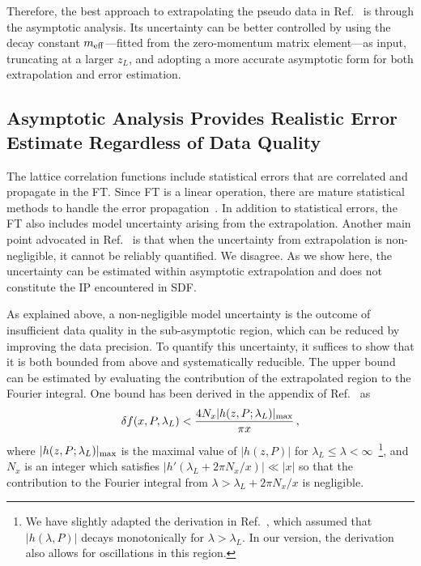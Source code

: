 \documentclass[prd,twocolumn,superscriptaddress,preprintnumbers,showpacs,nofootinbib,notitlepage,floatfix]{revtex4-2}
\begin{document}
Therefore, the best approach to extrapolating the pseudo data in Ref.~\cite{Dutrieux:2025jed} is through the asymptotic analysis. Its uncertainty can be better controlled by using the decay constant $m_{\rm eff}$---fitted from the zero-momentum matrix element---as input, truncating at a larger $z_L$, and adopting a more accurate asymptotic form for both extrapolation and error estimation.

\subsection{Asymptotic Analysis Provides Realistic Error Estimate Regardless of Data Quality}
\label{sec:ft-error}

The lattice correlation functions include statistical errors that are correlated and propagate in the FT. Since FT is a linear operation, there are mature statistical methods to handle the error propagation~\cite{Young:2012kg}. In addition to statistical errors, the FT also includes model uncertainty arising from the extrapolation. Another main point advocated in Ref.~\cite{Dutrieux:2025jed} is that when the uncertainty from extrapolation is non-negligible, it cannot be reliably quantified. We disagree. As we show here, the uncertainty can be estimated within asymptotic extrapolation and does not constitute the IP encountered in SDF.

As explained above, a non-negligible model uncertainty is the outcome of insufficient data quality in the sub-asymptotic region, which can be reduced by improving the data precision. To quantify this uncertainty, it suffices to show that it is both bounded from above and systematically reducible. The upper bound can be estimated by evaluating the contribution of the extrapolated region to the Fourier integral. One bound has been derived in the appendix of Ref.~\cite{Gao:2021dbh} as
\begin{align}\label{eq:bd}
    \delta f(x, P, \lambda_L) < \frac{4N_x |h(z,P;\lambda_L)|_{\rm max}}{\pi x}\,,
\end{align}
where $|h(z,P;\lambda_L)|_{\rm max}$ is the maximal value of $|h(z,P)|$ for $\lambda_L \le \lambda < \infty$~\footnote{We have slightly adapted the derivation in Ref.~\cite{Gao:2021dbh}, which assumed that $|h(\lambda, P)|$ decays monotonically for $\lambda > \lambda_L$. In our version, the derivation also allows for oscillations in this region.}, and $N_x$ is an integer which satisfies $|h'(\lambda_L+2\pi N_x/x)|\ll |x|$ so that the contribution to the Fourier integral from $\lambda > \lambda_L + 2\pi N_x/x$ is negligible.
\end{document}
